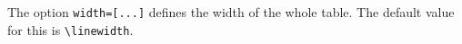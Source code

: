 \documentclass[]{myHOWTO-V001}
\begin{document}
The option \Verb|width=[...]| defines the width of the whole table. The default value for this is \Verb|\linewidth|.

%
%

\clearpage
\pagestyle{empty}
\printbibliography[heading=bibnumbered]
\clearpage
\pagestyle{plain}

%
%
\end{document}
